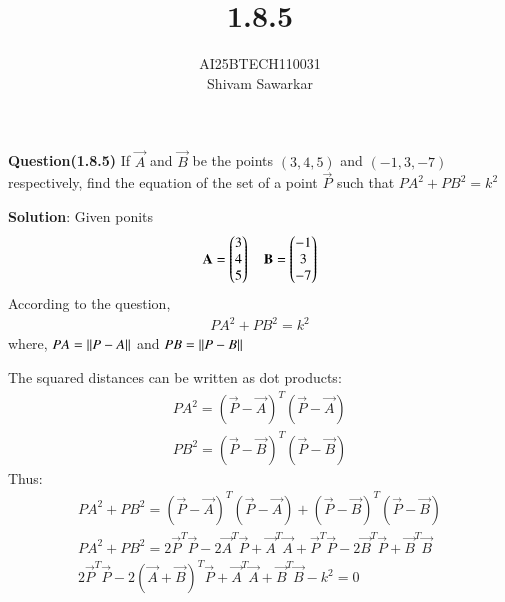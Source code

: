\documentclass[journal]{IEEEtran}
\begin{document}

\vspace{3cm}

\title{1.8.5}
\author{AI25BTECH110031 \\ Shivam Sawarkar}
 \maketitle
{\let\newpage\relax\maketitle}

\renewcommand{\thefigure}{\theenumi}
\renewcommand{\thetable}{\theenumi}
\setlength{\intextsep}{10pt} %


\renewcommand{\thetable}{\theenumi}

\textbf{Question(1.8.5)}
If $\vec{A}$ and $\vec{B}$ be the points $(3,4,5)$ and $(-1,3,-7)$ respectively, find the equation of the set of a point $\vec{P}$ such that $PA^2+{PB}^2=k^2$

\textbf{Solution}:
Given ponits 
\begin{align}
    \mathbf{A}=\begin{pmatrix}3 \\ 4 \\ 5\end{pmatrix} \quad \mathbf{B}=\begin{pmatrix}-1 \\ 3 \\ -7\end{pmatrix}
\end{align}
According to the question,  
\begin{align}
    PA^2+PB^2=k^2
\end{align}
where, $PA=\left\lVert P-A\right\rVert$ and $PB=\left\lVert P-B\right\rVert$

The squared distances can be written as dot products:
\begin{align}
    PA^2=(\vec{P}-\vec{A})^T(\vec{P}-\vec{A}) \\
    PB^2=(\vec{P}-\vec{B})^T(\vec{P}-\vec{B})
\end{align}
Thus:
\begin{align}
    PA^2+PB^2=(\vec{P}-\vec{A})^T(\vec{P}-\vec{A})+(\vec{P}-\vec{B})^T(\vec{P}-\vec{B}) \\
    PA^2+PB^2=2\vec{P}^T\vec{P}-2\vec{A}^T\vec{P}+\vec{A}^T\vec{A}+\vec{P}^T\vec{P}-2\vec{B}^T\vec{P}+\vec{B}^T\vec{B}\\ 
    2\vec{P}^T\vec{P}-2(\vec{A}+\vec{B})^T\vec{P}+\vec{A}^T\vec{A}+\vec{B}^T\vec{B}-k^2=0
\end{align}
\end{document}
